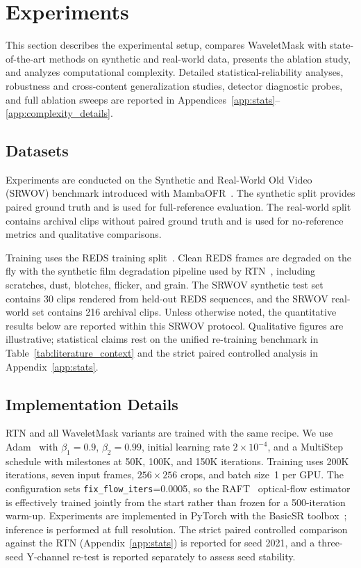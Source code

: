 \section{Experiments}\label{sec:results}

This section describes the experimental setup, compares WaveletMask with state-of-the-art methods on synthetic and real-world data, presents the ablation study, and analyzes computational complexity. Detailed statistical-reliability analyses, robustness and cross-content generalization studies, detector diagnostic probes, and full ablation sweeps are reported in Appendices~\ref{app:stats}--\ref{app:complexity_details}.

\subsection{Datasets}

Experiments are conducted on the Synthetic and Real-World Old Video (SRWOV) benchmark introduced with MambaOFR~\cite{mao2025mambaofr}. The synthetic split provides paired ground truth and is used for full-reference evaluation. The real-world split contains archival clips without paired ground truth and is used for no-reference metrics and qualitative comparisons.

Training uses the REDS training split~\cite{nah2019reds}. Clean REDS frames are degraded on the fly with the synthetic film degradation pipeline used by RTN~\cite{rtn2022}, including scratches, dust, blotches, flicker, and grain. The SRWOV synthetic test set contains 30 clips rendered from held-out REDS sequences, and the SRWOV real-world set contains 216 archival clips. Unless otherwise noted, the quantitative results below are reported within this SRWOV protocol. Qualitative figures are illustrative; statistical claims rest on the unified re-training benchmark in Table~\ref{tab:literature_context} and the strict paired controlled analysis in Appendix~\ref{app:stats}.

\subsection{Implementation Details}\label{subsec:implementation}

RTN and all WaveletMask variants are trained with the same recipe. We use Adam~\cite{kingma2015adam} with $\beta_1=0.9$, $\beta_2=0.99$, initial learning rate $2\times10^{-4}$, and a MultiStep schedule with milestones at 50K, 100K, and 150K iterations. Training uses 200K iterations, seven input frames, $256\times256$ crops, and batch size~1 per GPU. The configuration sets \texttt{fix\_flow\_iters}=0.0005, so the RAFT~\cite{teed2020raft} optical-flow estimator is effectively trained jointly from the start rather than frozen for a 500-iteration warm-up. Experiments are implemented in PyTorch with the BasicSR toolbox~\cite{wang2022basicsr}; inference is performed at full resolution. The strict paired controlled comparison against the RTN (Appendix~\ref{app:stats}) is reported for seed 2021, and a three-seed Y-channel re-test is reported separately to assess seed stability.

